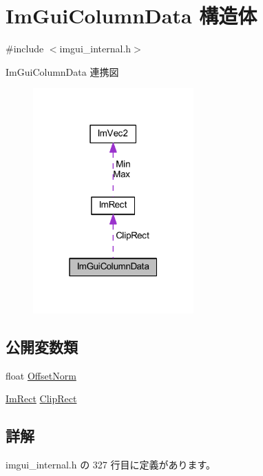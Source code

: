 \hypertarget{struct_im_gui_column_data}{}\section{Im\+Gui\+Column\+Data 構造体}
\label{struct_im_gui_column_data}


{\ttfamily \#include $<$imgui\+\_\+internal.\+h$>$}



Im\+Gui\+Column\+Data 連携図\nopagebreak
\begin{figure}[H]
\begin{center}
\leavevmode
\includegraphics[width=175pt]{struct_im_gui_column_data__coll__graph}
\end{center}
\end{figure}
\subsection*{公開変数類}
\begin{DoxyCompactItemize}
\item 
float \mbox{\hyperlink{struct_im_gui_column_data_a9678a00f55c9fa44ed35ec14ea9b697b}{Offset\+Norm}}
\item 
\mbox{\hyperlink{struct_im_rect}{Im\+Rect}} \mbox{\hyperlink{struct_im_gui_column_data_aeccf8bbbd380fdd9d3350b5aac95ad34}{Clip\+Rect}}
\end{DoxyCompactItemize}


\subsection{詳解}


 imgui\+\_\+internal.\+h の 327 行目に定義があります。



